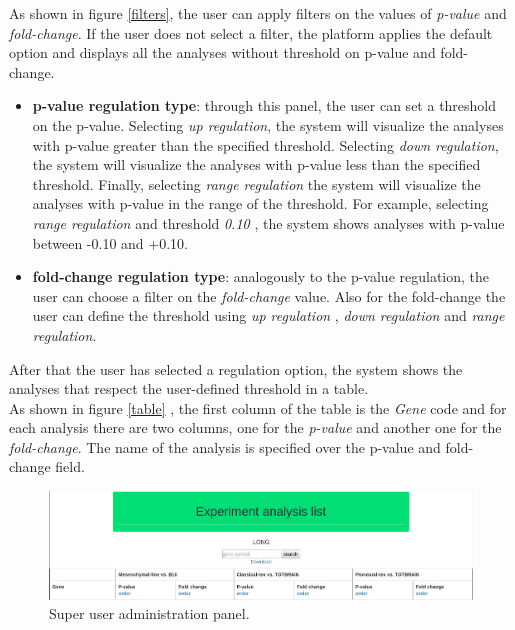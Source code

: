 \documentclass[a4paper]{report}
\begin{document}
As shown in figure \ref{filters}, the user can apply filters on the values of \emph{p-value} and \emph{fold-change}. If the user does not select a filter, the platform applies the default option and displays all the analyses without threshold on p-value and fold-change.

\begin{itemize}
    \item \textbf{p-value regulation type}: through this panel, the user can set a threshold on the p-value. Selecting \emph{up regulation}, the system will visualize the analyses with p-value greater than the specified threshold. Selecting \emph{down regulation}, the system will visualize the analyses with p-value less than the specified threshold. Finally, selecting \emph{range regulation} the system will visualize the analyses with p-value in the range of the threshold. For example, selecting \emph{range regulation} and threshold \emph{0.10} , the system shows analyses with p-value between -0.10 and +0.10.
    \item \textbf{fold-change regulation type}: analogously to the p-value regulation, the user can choose a filter on the \emph{fold-change} value. Also for the fold-change the user can define the threshold using \emph{up regulation} , \emph{down regulation} and \emph{range regulation}.
\end{itemize}

After that the user has selected a regulation option, the system shows the analyses that respect the user-defined threshold in a table.\\
As shown in figure \ref{table} , the first column of the table is the \emph{Gene} code and for each analysis there are two columns, one for the \emph{p-value} and another one for the \emph{fold-change}. The name of the analysis is specified over the p-value and fold-change field.\\

\begin{figure}[htb] 
\begin{center}
\includegraphics[scale=0.4]{figure/tableHeader.jpg} 
\end{center}
\caption{Super user administration panel.}
\label{tableHeader}
\end{figure}
\end{document}

